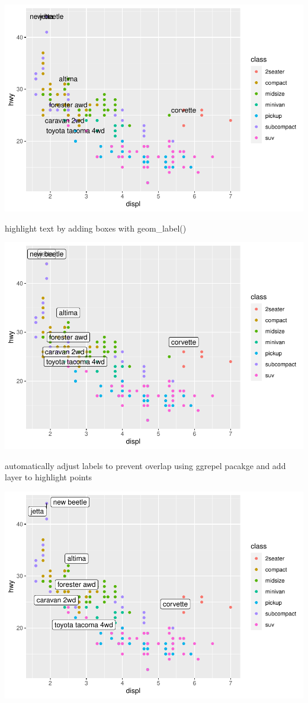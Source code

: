 \documentclass[
]{article}
\begin{document}
\includegraphics{rmarkdown_tutorial_files/figure-latex/unnamed-chunk-15-1.pdf}

highlight text by adding boxes with geom\_label()

\includegraphics{rmarkdown_tutorial_files/figure-latex/unnamed-chunk-16-1.pdf}

automatically adjust labels to prevent overlap using ggrepel pacakge and
add layer to highlight points

\includegraphics{rmarkdown_tutorial_files/figure-latex/unnamed-chunk-17-1.pdf}
\end{document}
